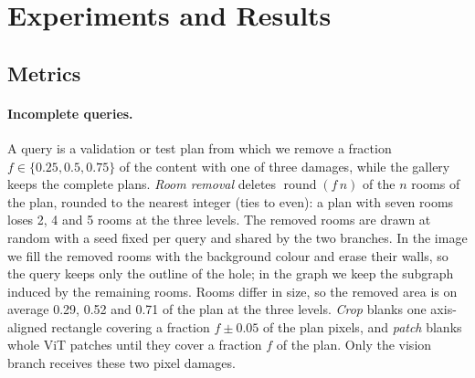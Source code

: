 \section{Experiments and Results}
\label{sec:experiments}

\subsection{Metrics}
\label{sec:metrics}


\paragraph{Incomplete queries.}
A query is a validation or test plan from which we remove a fraction $f\in\{0.25, 0.5, 0.75\}$ of the content with one of three damages, while the gallery keeps the complete plans.
\emph{Room removal} deletes $\operatorname{round}(f\,n)$ of the $n$ rooms of the plan, rounded to the nearest integer (ties to even): a plan with seven rooms loses 2, 4 and 5 rooms at the three levels.
The removed rooms are drawn at random with a seed fixed per query and shared by the two branches.
In the image we fill the removed rooms with the background colour and erase their walls, so the query keeps only the outline of the hole; in the graph we keep the subgraph induced by the remaining rooms.
Rooms differ in size, so the removed area is on average 0.29, 0.52 and 0.71 of the plan at the three levels.
\emph{Crop} blanks one axis-aligned rectangle covering a fraction $f\pm0.05$ of the plan pixels, and \emph{patch} blanks whole ViT patches until they cover a fraction $f$ of the plan.
Only the vision branch receives these two pixel damages.


